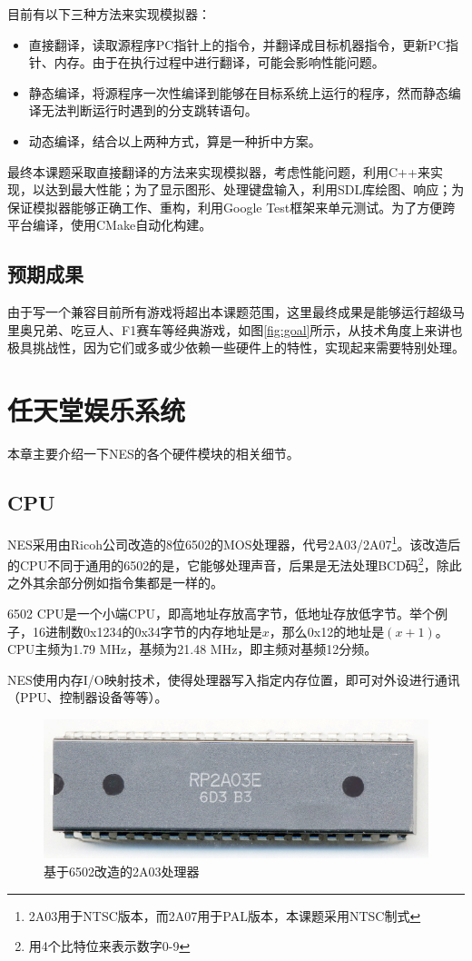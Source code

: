 \documentclass[a4paper]{ltxdoc}
\begin{document}
{目前有以下三种方法来实现模拟器：
\begin{itemize}
	\item 直接翻译，读取源程序PC指针上的指令，并翻译成目标机器指令，更新PC指针、内存。由于在执行过程中进行翻译，可能会影响性能问题。
	\item 静态编译，将源程序一次性编译到能够在目标系统上运行的程序，然而静态编译无法判断运行时遇到的分支跳转语句。
	\item 动态编译，结合以上两种方式，算是一种折中方案。
\end{itemize}

最终本课题采取直接翻译的方法来实现模拟器，考虑性能问题，利用C++来实现，以达到最大性能；为了显示图形、处理键盘输入，利用SDL库绘图、响应；为保证模拟器能够正确工作、重构，利用Google Test框架来单元测试。为了方便跨平台编译，使用CMake自动化构建。

\subsection{预期成果}
由于写一个兼容目前所有游戏将超出本课题范围，这里最终成果是能够运行超级马里奥兄弟、吃豆人、F1赛车等经典游戏，如图\ref{fig:goal}所示，从技术角度上来讲也极具挑战性，因为它们或多或少依赖一些硬件上的特性，实现起来需要特别处理。

\section{任天堂娱乐系统}
本章主要介绍一下NES的各个硬件模块的相关细节。

\subsection{CPU}
NES采用由Ricoh公司改造的8位6502的MOS处理器，代号2A03/2A07\footnote{2A03用于NTSC版本，而2A07用于PAL版本，本课题采用NTSC制式}。该改造后的CPU不同于通用的6502的是，它能够处理声音，后果是无法处理BCD码\footnote{用4个比特位来表示数字0-9}，除此之外其余部分例如指令集都是一样的。

6502 CPU是一个小端CPU，即高地址存放高字节，低地址存放低字节。举个例子，16进制数0x1234的0x34字节的内存地址是$x$，那么0x12的地址是$(x+1)$。CPU主频为1.79 MHz，基频为21.48 MHz，即主频对基频12分频。

NES使用内存I/O映射技术，使得处理器写入指定内存位置，即可对外设进行通讯（PPU、控制器设备等等）。

\begin{figure}[h]
	\centering
	\includegraphics{images/RP2A03E.jpg}
	\caption{基于6502改造的2A03处理器}
	\label{fig:2a03}
\end{figure}

}
\end{document}
